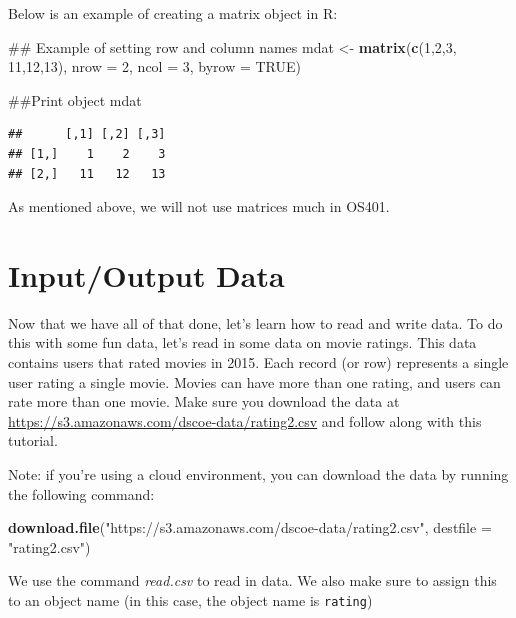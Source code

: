 \documentclass[]{book}
\newenvironment{Shaded}{\begin{snugshade}}{\end{snugshade}}
\newcommand{\KeywordTok}[1]{\textcolor[rgb]{0.13,0.29,0.53}{\textbf{{#1}}}}
\newcommand{\DataTypeTok}[1]{\textcolor[rgb]{0.13,0.29,0.53}{{#1}}}
\newcommand{\DecValTok}[1]{\textcolor[rgb]{0.00,0.00,0.81}{{#1}}}
\newcommand{\StringTok}[1]{\textcolor[rgb]{0.31,0.60,0.02}{{#1}}}
\newcommand{\OtherTok}[1]{\textcolor[rgb]{0.56,0.35,0.01}{{#1}}}
\newcommand{\NormalTok}[1]{{#1}}
\begin{document}
Below is an example of creating a matrix object in R:

\begin{Shaded}
\begin{Highlighting}[]
\NormalTok{## Example of setting row and column names}
\NormalTok{mdat <-}\StringTok{ }\KeywordTok{matrix}\NormalTok{(}\KeywordTok{c}\NormalTok{(}\DecValTok{1}\NormalTok{,}\DecValTok{2}\NormalTok{,}\DecValTok{3}\NormalTok{, }\DecValTok{11}\NormalTok{,}\DecValTok{12}\NormalTok{,}\DecValTok{13}\NormalTok{), }\DataTypeTok{nrow =} \DecValTok{2}\NormalTok{, }\DataTypeTok{ncol =} \DecValTok{3}\NormalTok{, }\DataTypeTok{byrow =} \OtherTok{TRUE}\NormalTok{)}

\NormalTok{##Print object}
\NormalTok{mdat}
\end{Highlighting}
\end{Shaded}

\begin{verbatim}
##      [,1] [,2] [,3]
## [1,]    1    2    3
## [2,]   11   12   13
\end{verbatim}

As mentioned above, we will not use matrices much in OS401.

\section{Input/Output Data}\label{inputoutput-data}

Now that we have all of that done, let's learn how to read and write
data. To do this with some fun data, let's read in some data on movie
ratings. This data contains users that rated movies in 2015. Each record
(or row) represents a single user rating a single movie. Movies can have
more than one rating, and users can rate more than one movie. Make sure
you download the data at
\url{https://s3.amazonaws.com/dscoe-data/rating2.csv} and follow along
with this tutorial.

Note: if you're using a cloud environment, you can download the data by
running the following command:

\begin{Shaded}
\begin{Highlighting}[]
\KeywordTok{download.file}\NormalTok{(}\StringTok{"https://s3.amazonaws.com/dscoe-data/rating2.csv"}\NormalTok{, }\DataTypeTok{destfile =} \StringTok{"rating2.csv"}\NormalTok{)}
\end{Highlighting}
\end{Shaded}

We use the command \emph{read.csv} to read in data. We also make sure to
assign this to an object name (in this case, the object name is
\texttt{rating})
\end{document}
